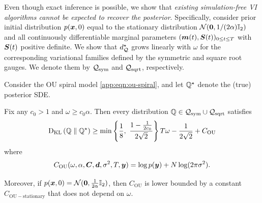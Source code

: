 Even though exact inference is possible, we show that \emph{existing simulation-free VI algorithms cannot be expected to recover the posterior}. 
Specifically, consider  prior initial distribution $p(\boldsymbol{x}, 0)$ equal to the stationary distribution $\mathcal{N}(\boldsymbol{0}, 1/(2\alpha)\mathbb{I}_2)$ and all continuously differentiable marginal parameters  $(\boldsymbol{m}(t), \boldsymbol{S}(t))_{0 \leq t \leq T}$ with $\boldsymbol{S}(t)$ positive definite.
We show that $d_{\mathcal{Q}}^\star$ grows linearly with $\omega$ for the corresponding variational families defined by the symmetric and square root gauges.
We denote them by $\mathcal{Q}_{\mathrm{sym}}$ and $\mathcal{Q}_{\mathrm{sqrt}}$, respectively.

\begin{theorem}
\label{thm:suboptimality-formal}
Consider the OU spiral model \cref{app:eqn:ou-spiral}, and let $\mathbb{Q}^\star$ denote the (true) posterior SDE.  

Fix any $c_0 > 1$ and $\omega \geq c_0 \alpha$. Then every distribution $\mathbb{Q} \in \mathcal{Q}_{\mathrm{sym}} \cup \mathcal{Q}_{\mathrm{sqrt}}$ satisfies
\begin{equation*}
    \textrm{D}_{\textrm{KL}}\left(\mathbb{Q}\;\|\;\mathbb{Q}^\star\right)
    \geq
     \min\left\{
        \frac{1}{8}, \  
        \frac{1-\frac{1}{2c_0}}{2\sqrt{2}}
    \right\}
    T \omega - \frac{1}{2\sqrt{2}} + C_{\mathrm{OU}}
\end{equation*}
where 
\begin{equation}\label{eqn:constant}
    C_{\mathrm{OU}}(\omega, \alpha, \boldsymbol{C}, \boldsymbol{d}, \sigma^2, T, \boldsymbol{y}) = \log p(\boldsymbol{y}) + N \log(2 \pi \sigma^2).
\end{equation}

\smallskip
Moreover, if $p(\boldsymbol{x}, 0) = \mathcal{N}(\boldsymbol{0}, \frac{1}{2\alpha} \mathbb{I}_2)$, then $C_{\mathrm{OU}}$ is lower bounded by a constant $C_{\mathrm{OU-stationary}}$ that does not depend on $\omega$.
\end{theorem}

